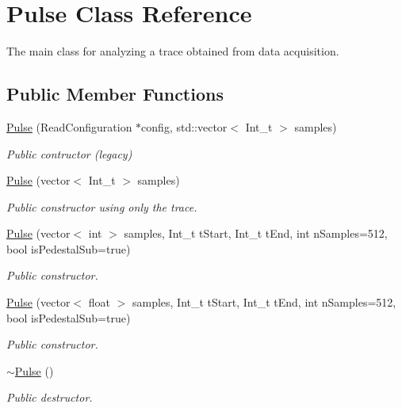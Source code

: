\hypertarget{classPulse}{}\section{Pulse Class Reference}
\label{classPulse}


The main class for analyzing a trace obtained from data acquisition.  


\subsection*{Public Member Functions}
\begin{DoxyCompactItemize}
\item 
\hyperlink{classPulse_a8b6f1069c6cf1323363b33752b264a1f}{Pulse} (Read\+Configuration $\ast$config, std\+::vector$<$ Int\+\_\+t $>$ samples)
\begin{DoxyCompactList}\small\item\em Public contructor (legacy) \end{DoxyCompactList}\item 
\hyperlink{classPulse_afc85a424b08596f5022919ca5ea9ffa4}{Pulse} (vector$<$ Int\+\_\+t $>$ samples)
\begin{DoxyCompactList}\small\item\em Public constructor using only the trace. \end{DoxyCompactList}\item 
\hyperlink{classPulse_a820248c8392c0c894beba568da50145a}{Pulse} (vector$<$ int $>$ samples, Int\+\_\+t t\+Start, Int\+\_\+t t\+End, int n\+Samples=512, bool is\+Pedestal\+Sub=true)
\begin{DoxyCompactList}\small\item\em Public constructor. \end{DoxyCompactList}\item 
\hyperlink{classPulse_ac1326dc991e88a469630b45bb01d88b0}{Pulse} (vector$<$ float $>$ samples, Int\+\_\+t t\+Start, Int\+\_\+t t\+End, int n\+Samples=512, bool is\+Pedestal\+Sub=true)
\begin{DoxyCompactList}\small\item\em Public constructor. \end{DoxyCompactList}\item 
\mbox{\label{classPulse_a0081f88108dfc1585a23eae533be0190}} 
\hyperlink{classPulse_a0081f88108dfc1585a23eae533be0190}{$\sim$\+Pulse} ()
\begin{DoxyCompactList}\small\item\em Public destructor. \end{DoxyCompactList}\item 

\end{DoxyCompactItemize}

